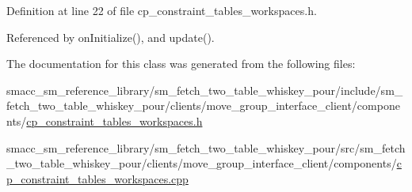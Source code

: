 Definition at line 22 of file cp\+\_\+constraint\+\_\+tables\+\_\+workspaces.\+h.



Referenced by on\+Initialize(), and update().



The documentation for this class was generated from the following files\+:\begin{DoxyCompactItemize}
\item 
smacc\+\_\+sm\+\_\+reference\+\_\+library/sm\+\_\+fetch\+\_\+two\+\_\+table\+\_\+whiskey\+\_\+pour/include/sm\+\_\+fetch\+\_\+two\+\_\+table\+\_\+whiskey\+\_\+pour/clients/move\+\_\+group\+\_\+interface\+\_\+client/components/\hyperlink{sm__fetch__two__table__whiskey__pour_2include_2sm__fetch__two__table__whiskey__pour_2clients_2moc98c43cc1d244b5ca25f16ee685e5636}{cp\+\_\+constraint\+\_\+tables\+\_\+workspaces.\+h}\item 
smacc\+\_\+sm\+\_\+reference\+\_\+library/sm\+\_\+fetch\+\_\+two\+\_\+table\+\_\+whiskey\+\_\+pour/src/sm\+\_\+fetch\+\_\+two\+\_\+table\+\_\+whiskey\+\_\+pour/clients/move\+\_\+group\+\_\+interface\+\_\+client/components/\hyperlink{sm__fetch__two__table__whiskey__pour_2src_2sm__fetch__two__table__whiskey__pour_2clients_2move__39e7198a5872fbd262a4e7f0dd06817b}{cp\+\_\+constraint\+\_\+tables\+\_\+workspaces.\+cpp}\end{DoxyCompactItemize}
